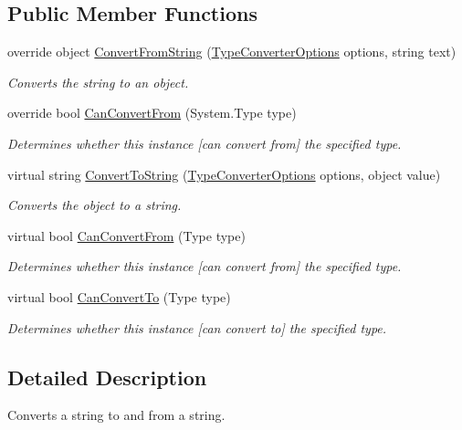 \subsection*{Public Member Functions}
\begin{DoxyCompactItemize}
\item 
override object \hyperlink{a00149_a50bf35ff93e01df630a9c5e3c7b7569f}{Convert\-From\-String} (\hyperlink{a00156}{Type\-Converter\-Options} options, string text)
\begin{DoxyCompactList}\small\item\em Converts the string to an object. \end{DoxyCompactList}\item 
override bool \hyperlink{a00149_a3e7f3959693638756bb98951fe8791f3}{Can\-Convert\-From} (System.\-Type type)
\begin{DoxyCompactList}\small\item\em Determines whether this instance \mbox{[}can convert from\mbox{]} the specified type. \end{DoxyCompactList}\item 
virtual string \hyperlink{a00084_a36cb2f9b24f15a671293f3a722324c27}{Convert\-To\-String} (\hyperlink{a00156}{Type\-Converter\-Options} options, object value)
\begin{DoxyCompactList}\small\item\em Converts the object to a string. \end{DoxyCompactList}\item 
virtual bool \hyperlink{a00084_a470d21adaa704eb281250dbd112ff91a}{Can\-Convert\-From} (Type type)
\begin{DoxyCompactList}\small\item\em Determines whether this instance \mbox{[}can convert from\mbox{]} the specified type. \end{DoxyCompactList}\item 
virtual bool \hyperlink{a00084_acb65bd8c8199d88d5b1629ae35d18514}{Can\-Convert\-To} (Type type)
\begin{DoxyCompactList}\small\item\em Determines whether this instance \mbox{[}can convert to\mbox{]} the specified type. \end{DoxyCompactList}\end{DoxyCompactItemize}


\subsection{Detailed Description}
Converts a string to and from a string. 



